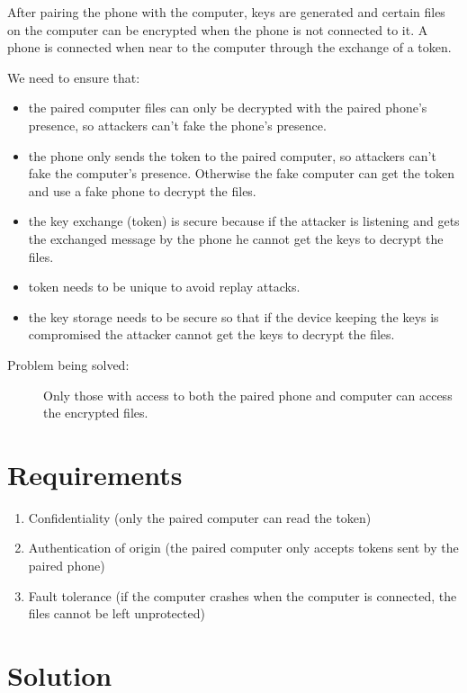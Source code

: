 \documentclass[11,]{article}
\providecommand{\tightlist}{%
  \setlength{\itemsep}{0pt}\setlength{\parskip}{0pt}}
\begin{document}
After pairing the phone with the computer, keys are generated and
certain files on the computer can be encrypted when the phone is not
connected to it. A phone is connected when near to the computer through
the exchange of a token.

We need to ensure that:

\begin{itemize}
\item
  the paired computer files can only be decrypted with the paired
  phone's presence, so attackers can't fake the phone's presence.
\item
  the phone only sends the token to the paired computer, so attackers
  can't fake the computer's presence. Otherwise the fake computer can
  get the token and use a fake phone to decrypt the files.
\item
  the key exchange (token) is secure because if the attacker is
  listening and gets the exchanged message by the phone he cannot get
  the keys to decrypt the files.
\item
  token needs to be unique to avoid replay attacks.
\item
  the key storage needs to be secure so that if the device keeping the
  keys is compromised the attacker cannot get the keys to decrypt the
  files.
\end{itemize}

\begin{description}
\item[Problem being solved:]
Only those with access to both the paired phone and computer can access
the encrypted files.
\end{description}

\hypertarget{requirements}{%
\section{Requirements}\label{requirements}}

\begin{enumerate}
\tightlist
\item
  Confidentiality (only the paired computer can read the token)
\item
  Authentication of origin (the paired computer only accepts tokens sent
  by the paired phone)
\item
  Fault tolerance (if the computer crashes when the computer is
  connected, the files cannot be left unprotected)
\end{enumerate}

\hypertarget{solution}{%
\section{Solution}\label{solution}}
\end{document}
